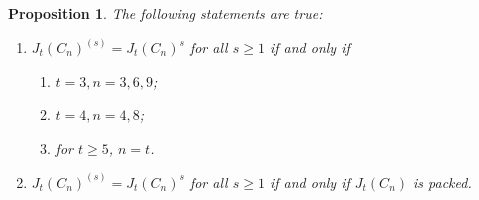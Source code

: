 \documentclass[12pt]{amsart}
\newtheorem{proposition}{Proposition}[section]
\begin{document}
\begin{proposition}\label{prop:symbolicpowers-cycles}
    The following statements are true:
    \begin{enumerate}
        \item $J_t(C_n)^{(s)}= J_t(C_n)^{s}$ for all $s\geq 1$ if and only if 
\begin{enumerate}
            \item $t=3, n=3,6,9$;
            
            \item $t=4, n=4,8$;
            
            \item for $t\geq 5$, $n=t$.
        \end{enumerate}
        
        \item $J_t(C_n)^{(s)}= J_t(C_n)^{s}$ for all $s\geq 1$ if and only if $J_t(C_n)$ is packed.
    \end{enumerate}    
\end{proposition}
\end{document}
